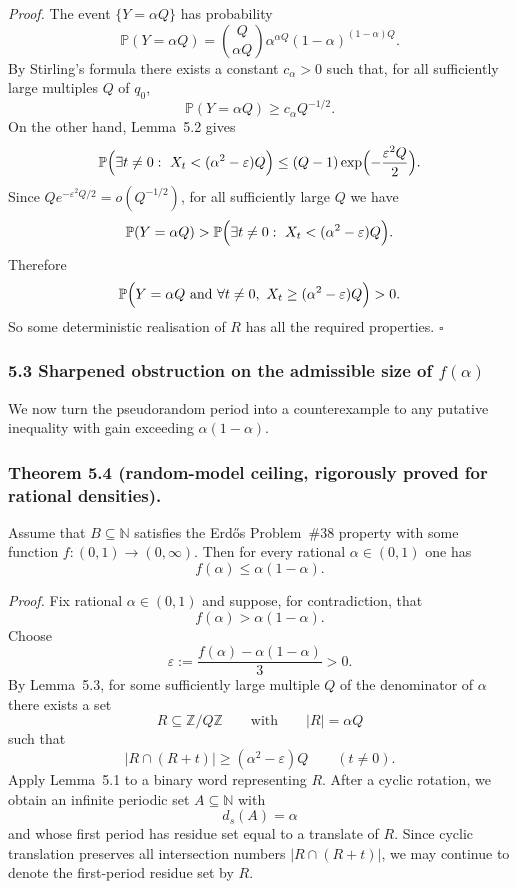 \emph{Proof.}
The event $\{Y=\alpha Q\}$ has probability
\[
\mathbb P(Y=\alpha Q)
= \binom{Q}{\alpha Q}\alpha^{\alpha Q}(1-\alpha)^{(1-\alpha)Q}.
\]
By Stirling's formula there exists a constant $c_\alpha>0$ such that, for all sufficiently large multiples $Q$ of $q_0$,
\[
\mathbb P(Y=\alpha Q)\ge c_\alpha Q^{-1/2}.
\]
On the other hand, Lemma~5.2 gives
\[
\mathbb P\Bigl(\exists t\neq 0:\ X_t< (\alpha^2-\varepsilon)Q\Bigr)
\le (Q-1)\exp\Bigl(-\frac{\varepsilon^2Q}{2}\Bigr).
\]
Since $Qe^{-\varepsilon^2Q/2}=o(Q^{-1/2})$, for all sufficiently large $Q$ we have
\[
\mathbb P(Y=\alpha Q)
>
\mathbb P\Bigl(\exists t\neq 0:\ X_t< (\alpha^2-\varepsilon)Q\Bigr).
\]
Therefore
\[
\mathbb P\Bigl(Y=\alpha Q\ \text{and}\ \forall t\neq 0,\ X_t\ge (\alpha^2-\varepsilon)Q\Bigr)>0.
\]
So some deterministic realisation of $R$ has all the required properties. \hfill$\square$

\subsubsection*{5.3 Sharpened obstruction on the admissible size of $f(\alpha)$}
We now turn the pseudorandom period into a counterexample to any putative inequality with gain exceeding $\alpha(1-\alpha)$.

\subsubsection*{Theorem 5.4 (random-model ceiling, rigorously proved for rational densities).}
Assume that $B\subseteq\mathbb N$ satisfies the Erd\H{o}s Problem~\#38 property with some function $f:(0,1)\to(0,\infty)$.
Then for every rational $\alpha\in(0,1)$ one has
\[
 f(\alpha)\le \alpha(1-\alpha).
\]

\emph{Proof.}
Fix rational $\alpha\in(0,1)$ and suppose, for contradiction, that
\[
 f(\alpha)>\alpha(1-\alpha).
\]
Choose
\[
\varepsilon:=\frac{f(\alpha)-\alpha(1-\alpha)}{3}>0.
\]
By Lemma~5.3, for some sufficiently large multiple $Q$ of the denominator of $\alpha$ there exists a set
\[
R\subseteq \mathbb Z/Q\mathbb Z
\qquad\text{with}\qquad
|R|=\alpha Q
\]
such that
\[
|R\cap(R+t)|\ge (\alpha^2-\varepsilon)Q
\qquad (t\neq 0).
\]
Apply Lemma~5.1 to a binary word representing $R$. After a cyclic rotation, we obtain an infinite periodic set $A\subseteq\mathbb N$ with
\[
 d_s(A)=\alpha
\]
and whose first period has residue set equal to a translate of $R$. Since cyclic translation preserves all intersection numbers $|R\cap(R+t)|$, we may continue to denote the first-period residue set by $R$.

